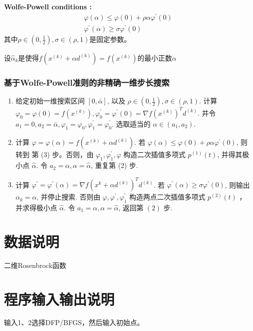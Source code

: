 \documentclass[12pt, a4paper, oneside]{ctexart}
\begin{document}
\textbf{Wolfe-Powell conditions :}
$$
\begin{gathered}
\varphi(\alpha) \leq \varphi(0)+\rho \alpha \varphi^{\prime}(0) \\
\varphi^{\prime}(\alpha) \geq \sigma \varphi^{\prime}(0)
\end{gathered}
$$
其中$\rho \in (0, \frac{1}{2}), \sigma \in (\rho , 1)$是固定参数。

设$\hat{\alpha}_{k}$是使得$f(x^{(k)} + \alpha d^{(k)}) = f(x^{(k)})$的最小正数$\alpha$

\subsubsection*{基于Wolfe-Powell准则的非精确一维步长搜索}
\begin{enumerate}[(1)]
    \item 给定初始一维搜索区间 $[0, \bar{\alpha}]$, 以及 $\rho \in\left(0, \frac{1}{2}\right), \sigma \in(\rho, 1)$. 计算 $\varphi_0=\varphi(0)=f\left(x^{(k)}\right), \varphi_0^{\prime}=\varphi^{\prime}(0)=\nabla f\left(x^{(k)}\right)^T d^{(k)}$. 并令 $a_1=0, a_2=\bar{\alpha}, \varphi_1=\varphi_0, \varphi_1^{\prime}=\varphi_0^{\prime}$. 选取适当的 $\alpha \in\left(a_1, a_2\right)$.
    \item 计算 $\varphi=\varphi(\alpha)=f\left(x^{(k)}+\alpha d^{(k)}\right)$. 若 $\varphi(\alpha) \leq \varphi(0)+\rho \alpha \varphi^{\prime}(0)$, 则转到 第 (3) 步。否则，由 $\varphi_1, \varphi_1^{\prime}, \varphi$ 构造二次插值多项式 $p^{(1)}(t)$, 并得其极小点 $\hat{\alpha}$. 令 $a_2=\alpha, \alpha=\hat{\alpha}$, 重复第 (2) 步.
    \item 计算 $\varphi^{\prime}=\varphi^{\prime}(\alpha)=\nabla f\left(x^k+\alpha d^{(k)}\right)^T d^{(k)}$. 若 $\varphi^{\prime}(\alpha) \geq \sigma \varphi^{\prime}(0)$, 则输出 $\alpha_k=\alpha$, 并停止搜索. 否则由 $\varphi, \varphi^{\prime}, \varphi_1^{\prime}$ 构造两点二次插值多项式 $p^{(2)}(t)$ ， 并求得极小点 $\hat{\alpha}$. 令 $a_1=\alpha, \alpha=\hat{\alpha}$, 返回第 $(2)$ 步.
\end{enumerate}

\section*{数据说明}
二维Rosenbrock函数
\section*{程序输入输出说明}
输入1、2选择DFP/BFGS，然后输入初始点。
\end{document}
